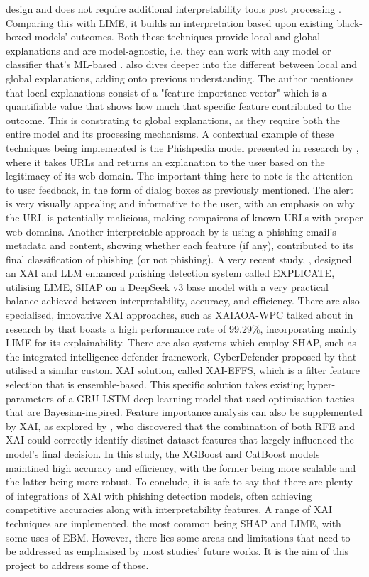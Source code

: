 design and does not require additional interpretability tools post processing \citep{greco2023explaining}. Comparing this with LIME, it builds an interpretation based upon existing black-boxed models' outcomes. Both these techniques provide local and global explanations and are model-agnostic, i.e. they can work with any model or classifier that's ML-based \citep{anderson2015polymorphic}. \cite{greco2023explaining} also dives deeper into the different between local and global explanations, adding onto previous understanding. The author mentiones that local explanations consist of a "feature importance vector" which is a quantifiable value that shows how much that specific feature contributed to the outcome. This is constrating to global explanations, as they require both the entire model and its processing mechanisms. A contextual example of these techniques being implemented is the Phishpedia model presented in research by \cite{lin2021phishpedia}, where it takes URLs and returns an explanation to the user based on the legitimacy of its web domain. The important thing here to note is the attention to user feedback, in the form of dialog boxes as previously mentioned. The alert is very visually appealing and informative to the user, with an emphasis on why the URL is potentially malicious, making compairons of known URLs with proper web domains. Another interpretable approach by \cite{bravo2010bridging} is using a phishing email's metadata and content, showing whether each feature (if any), contributed to its final classification of phishing (or not phishing). A very recent study, \cite{lim2025explicate}, designed an XAI and LLM enhanced phishing detection system called EXPLICATE, utilising LIME, SHAP on a DeepSeek v3 base model with a very practical balance achieved between interpretability, accuracy, and efficiency. There are also specialised, innovative XAI approaches, such as XAIAOA-WPC talked about in research by \cite{alotaibi2025explainable} that boasts a high performance rate of 99.29\%, incorporating mainly LIME for its explainability. There are also systems which employ SHAP, such as the integrated intelligence defender framework, CyberDefender proposed by \cite{krishnaveni2024cyberdefender} that utilised a similar custom XAI solution, called XAI-EFFS, which is a filter feature selection that is ensemble-based. This specific solution takes existing hyper-parameters of a GRU-LSTM deep learning model that used optimisation tactics that are Bayesian-inspired. Feature importance analysis can also be supplemented by XAI, as explored by \cite{fajar2024enhancing}, who discovered that the combination of both RFE and XAI could correctly identify distinct dataset features that largely influenced the model's final decision. In this study, the XGBoost and CatBoost models maintined high accuracy and efficiency, with the former being more scalable and the latter being more robust. To conclude, it is safe to say that there are plenty of integrations of XAI with phishing detection models, often achieving competitive accuracies along with interpretability features. A range of XAI techniques are implemented, the most common being SHAP and LIME, with some uses of EBM. However, there lies some areas and limitations that need to be addressed as emphasised by most studies' future works. It is the aim of this project to address some of those.
